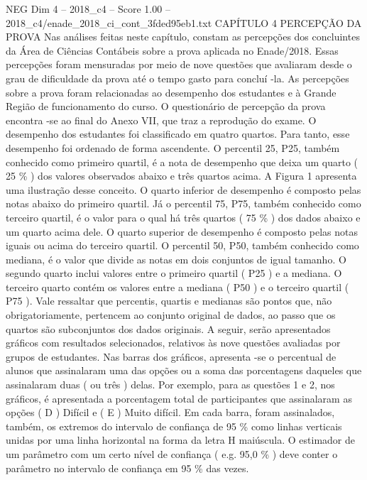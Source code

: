\begin{textsample}{NEG Dim 4 – 2018\_c4 – Score 1.00 – 2018\_c4/enade\_2018\_ci\_cont\_3fded95eb1.txt}  \label{ex:f4_neg_170}
CAPÍTULO 4 PERCEPÇÃO DA PROVA Nas análises feitas neste capítulo, constam as percepções dos concluintes da Área de Ciências Contábeis sobre a prova aplicada no Enade/2018.
Essas percepções foram mensuradas por meio de nove questões que avaliaram desde o grau de dificuldade da prova até o tempo gasto para concluí -la.
As percepções sobre a prova foram relacionadas ao desempenho dos estudantes e à Grande Região de funcionamento do curso.
O questionário de percepção da prova encontra -se ao final do Anexo VII, que traz a reprodução do exame.
O desempenho dos estudantes foi classificado em quatro quartos.
Para tanto, esse desempenho foi ordenado de forma ascendente.
O percentil 25, P25, também conhecido como primeiro quartil, é a nota de desempenho que deixa um quarto ( 25 \% ) dos valores observados abaixo e três quartos acima.
A Figura 1 apresenta uma ilustração desse conceito.
O quarto inferior de desempenho é composto pelas notas abaixo do primeiro quartil.
Já o percentil 75, P75, também conhecido como terceiro quartil, é o valor para o qual há três quartos ( 75 \% ) dos dados abaixo e um quarto acima dele.
O quarto superior de desempenho é composto pelas notas iguais ou acima do terceiro quartil.
O percentil 50, P50, também conhecido como mediana, é o valor que divide as notas em dois conjuntos de igual tamanho.
O segundo quarto inclui valores entre o primeiro quartil ( P25 ) e a mediana.
O terceiro quarto contém os valores entre a mediana ( P50 ) e o terceiro quartil ( P75 ).
Vale ressaltar que percentis, quartis e medianas são pontos que, não obrigatoriamente, pertencem ao conjunto original de dados, ao passo que os quartos são subconjuntos dos dados originais.
A seguir, serão apresentados gráficos com resultados selecionados, relativos às nove questões avaliadas por grupos de estudantes.
Nas barras dos gráficos, apresenta -se o percentual de alunos que assinalaram uma das opções ou a soma das porcentagens daqueles que assinalaram duas ( ou três ) delas.
Por exemplo, para as questões 1 e 2, nos gráficos, é apresentada a porcentagem total de participantes que assinalaram as opções ( D ) Difícil e ( E ) Muito difícil.
Em cada barra, foram assinalados, também, os extremos do intervalo de confiança de 95 \% como linhas verticais unidas por uma linha horizontal na forma da letra H maiúscula.
O estimador de um parâmetro com um certo nível de confiança ( e.g. 95,0 \% ) deve conter o parâmetro no intervalo de confiança em 95 \% das vezes.

\end{textsample}
